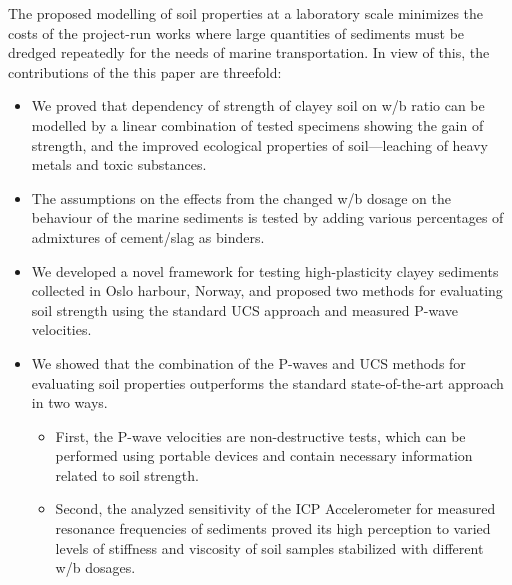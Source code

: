 \documentclass[sustainability,article,accept,pdftex,moreauthors]{Definitions/mdpi}
\begin{document}
{{The proposed modelling of soil properties at a laboratory scale minimizes the costs of {the }project-run works where large quantities of sediments must be dredged repeatedly for the needs of marine transportation. {In view of this, }the contributions of the this paper are threefold:
\begin{itemize}
  \item We proved that dependency of strength of clayey soil on w/b ratio can be modelled by a linear combination of tested specimens showing the gain of strength, and the improved ecological properties of soil---leaching of heavy metals and toxic substances. 
  \item The assumptions on the effects from {the }changed w/b dosage on{ the }behaviour {of the marine sediments }is tested by adding various percentages of admixtures of cement/slag as binders.
  \item We developed a novel framework for testing high-plasticity clayey sediments collected in Oslo harbour, Norway, and proposed two methods for evaluating soil strength using the standard UCS approach and measured P-wave velocities. 
  \item We showed that the combination of {the }P-waves and UCS methods for evaluating soil properties outperforms the standard state-of-the-art approach in two ways. 
  	\begin{itemize}[leftmargin=0.8cm,labelsep=4.9mm]
  		\item First, the P-wave velocities are non-destructive tests, which can be performed using portable devices and contain necessary information related to soil strength. 
		\item Second, the analyzed sensitivity of the ICP Accelerometer for measured resonance frequencies of sediments proved its high perception to varied {levels of }stiffness and viscosity of {soil }samples stabilized with different w/b dosages.
	\end{itemize}
\end{itemize}

}}
\end{document}
